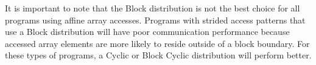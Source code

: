 It is important to note that the Block distribution is not the best choice for all programs using affine array accesses. Programs with strided access patterns that use a Block distribution will have poor communication performance because accessed array elements are more likely to reside outside of a block boundary. For these types of programs, a Cyclic or Block Cyclic distribution will perform better. 
